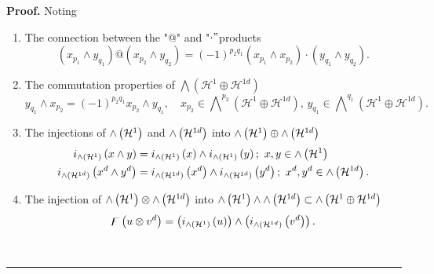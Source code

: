 \documentclass[aps,preprint]{revtex4}%
\newenvironment{proof}[1][Proof]{\noindent\textbf{#1.} }{\ \rule{0.5em}{0.5em}}
\begin{document}
\begin{proof}
Noting

\begin{enumerate}
\item The connection between the "@" and "$\cdot"$products
\begin{equation}
\left(  x_{p_{1}}\wedge y_{q_{1}}\right)  @\left(  x_{p_{2}}\wedge y_{q_{2}%
}\right)  =\left(  -1\right)  ^{p_{2}q_{1}}\left(  x_{p_{1}}\wedge x_{p_{2}%
}\right)  \cdot\left(  y_{q_{1}}\wedge y_{q_{2}}\right)  .
\end{equation}


\item The commutation properties of $%
{\textstyle\bigwedge}
\left(  \mathcal{H}^{1}\oplus\mathcal{H}^{1d}\right)  $
\begin{equation}
y_{q_{1}}\wedge x_{p_{2}}=\left(  -1\right)  ^{p_{2}q_{1}}x_{p_{2}}\wedge
y_{q_{1}},\quad x_{p_{2}}\in%
{\textstyle\bigwedge\nolimits^{p_{2}}}
\left(  \mathcal{H}^{1}\oplus\mathcal{H}^{1d}\right)  ,\,y_{q_{1}}\in%
{\textstyle\bigwedge\nolimits^{q_{1}}}
\left(  \mathcal{H}^{1}\oplus\mathcal{H}^{1d}\right)  .
\end{equation}


\item The injections of ${\huge \wedge}\left(  \mathcal{H}^{1}\right)  $ and
${\huge \wedge}\left(  \mathcal{H}^{1d}\right)  $ into ${\huge \wedge}\left(
\mathcal{H}^{1}\right)  \oplus{\huge \wedge}\left(  \mathcal{H}^{1d}\right)
$
\begin{align}
i_{{\huge \wedge}\left(  \mathcal{H}^{1}\right)  }\left(  x\wedge y\right)
&  =i_{{\huge \wedge}\left(  \mathcal{H}^{1}\right)  }\left(  x\right)  \wedge
i_{{\huge \wedge}\left(  \mathcal{H}^{1}\right)  }\left(  y\right)
;\,\,x,y\in{\huge \wedge}\left(  \mathcal{H}^{1}\right) \\
i_{{\huge \wedge}\left(  \mathcal{H}^{1d}\right)  }\left(  x^{d}\wedge
y^{d}\right)   &  =i_{{\huge \wedge}\left(  \mathcal{H}^{1d}\right)  }\left(
x^{d}\right)  \wedge i_{{\huge \wedge}\left(  \mathcal{H}^{1d}\right)
}\left(  y^{d}\right)  ;\,\,x^{d},y^{d}\in{\huge \wedge}\left(  \mathcal{H}%
^{1d}\right)  .
\end{align}


\item The injection of ${\huge \wedge}\left(  \mathcal{H}^{1}\right)
\otimes{\huge \wedge}\left(  \mathcal{H}^{1d}\right)  $ into ${\huge \wedge
}\left(  \mathcal{H}^{1}\right)  \wedge{\huge \wedge}\left(  \mathcal{H}%
^{1d}\right)  \subset{\huge \wedge}\left(  \mathcal{H}^{1}\oplus
\mathcal{H}^{1d}\right)  $%
\begin{equation}
\digamma\left(  u\otimes v^{d}\right)  =\left(  i_{{\huge \wedge}\left(
\mathcal{H}^{1}\right)  }\left(  u\right)  \right)  \wedge\left(
i_{{\huge \wedge}\left(  \mathcal{H}^{1d}\right)  }\left(  v^{d}\right)
\right)  .
\end{equation}



\end{enumerate}
\end{proof}
\end{document}
